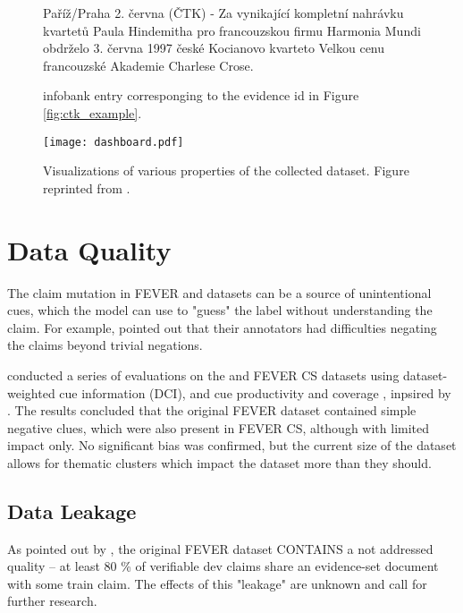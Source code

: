 \begin{figure}[h!]
    \begin{framed}
        Paříž/Praha 2. června (ČTK) - Za vynikající kompletní nahrávku kvartetů Paula Hindemitha pro francouzskou firmu Harmonia Mundi obdrželo 3. června 1997 české Kocianovo kvarteto Velkou cenu francouzské Akademie Charlese Crose.
    \end{framed}
    \caption[\CTK{} Infobank Example]{\CTK{} infobank entry corresponging to the evidence id in Figure \ref{fig:ctk_example}.}
\end{figure}

\begin{figure}[h!]
  \texttt{[image: dashboard.pdf]}
  \caption[Visualizations of Properties of the Collected Dataset]{Visualizations of various properties of the collected \CTK{} dataset. Figure reprinted from \citet{ullrich}.}
  \label{fig:dashboard}
  \end{figure}

\section{Data Quality}

The claim mutation in FEVER and \CTK{} datasets can be a source of unintentional cues, which the model can use to "guess" the label without understanding the claim.
For example, \citet{fever} pointed out that their annotators had difficulties negating the claims beyond trivial negations.

\citet{rypar} conducted a series of evaluations on the \CTK{} and FEVER CS datasets using dataset-weighted cue information (DCI), and cue productivity and coverage \citep{niven-probing}, inpsired by \citet{derczynski-etal-2020-maintaining}. 
The results concluded that the original FEVER dataset contained simple negative clues, which were also present in FEVER CS, although with limited impact only. No significant bias was confirmed, but the current size of the \CTK{} dataset allows for thematic clusters which impact the dataset more than they should. 

\subsection{Data Leakage}

As pointed out by \citet{ullrich}, the original FEVER dataset CONTAINS a not addressed quality -- at least 80 \% of verifiable dev claims share an evidence-set document with some train claim. The effects of this "leakage" are unknown and call for further research.